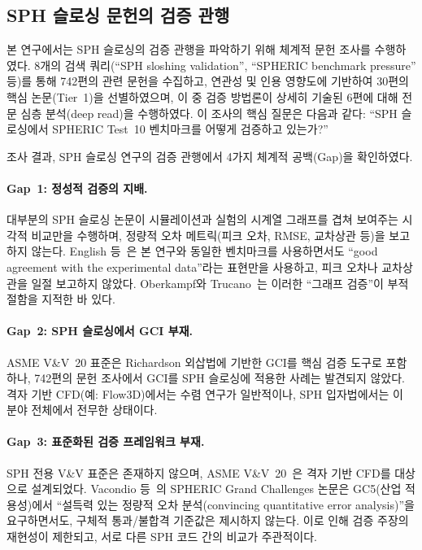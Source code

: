 \documentclass[11pt]{article}
\begin{document}
\subsection{SPH 슬로싱 문헌의 검증 관행} \label{sec:lit}

본 연구에서는 SPH 슬로싱의 검증 관행을 파악하기 위해 체계적 문헌 조사를 수행하였다.
8개의 검색 쿼리(``SPH sloshing validation'', ``SPHERIC benchmark pressure'' 등)를 통해
742편의 관련 문헌을 수집하고, 연관성 및 인용 영향도에 기반하여 30편의 핵심 논문(Tier~1)을
선별하였으며, 이 중 검증 방법론이 상세히 기술된 6편에 대해 전문 심층 분석(deep read)을
수행하였다.
이 조사의 핵심 질문은 다음과 같다:
``SPH 슬로싱에서 SPHERIC Test~10 벤치마크를 어떻게 검증하고 있는가?''

조사 결과, SPH 슬로싱 연구의 검증 관행에서 4가지 체계적 공백(Gap)을 확인하였다.

\paragraph{Gap~1: 정성적 검증의 지배.}
대부분의 SPH 슬로싱 논문이 시뮬레이션과 실험의 시계열 그래프를 겹쳐 보여주는
시각적 비교만을 수행하며, 정량적 오차 메트릭(피크 오차, RMSE, 교차상관 등)을
보고하지 않는다. English 등~\cite{English2022}은 본 연구와 동일한 벤치마크를
사용하면서도 ``good agreement with the experimental data''라는 표현만을 사용하고,
피크 오차나 교차상관을 일절 보고하지 않았다.
Oberkampf와 Trucano~\cite{Oberkampf2002}는 이러한 ``그래프 검증''이
부적절함을 지적한 바 있다.

\paragraph{Gap~2: SPH 슬로싱에서 GCI 부재.}
ASME V\&V~20 표준은 Richardson 외삽법에 기반한 GCI를 핵심 검증 도구로 포함하나,
742편의 문헌 조사에서 GCI를 SPH 슬로싱에 적용한 사례는 발견되지 않았다.
격자 기반 CFD(예: Flow3D)에서는 수렴 연구가 일반적이나, SPH 입자법에서는
이 분야 전체에서 전무한 상태이다.

\paragraph{Gap~3: 표준화된 검증 프레임워크 부재.}
SPH 전용 V\&V 표준은 존재하지 않으며, ASME V\&V~20~\cite{ASME2009}은
격자 기반 CFD를 대상으로 설계되었다.
Vacondio 등~\cite{Vacondio2020}의 SPHERIC Grand Challenges 논문은
GC5(산업 적용성)에서 ``설득력 있는 정량적 오차 분석(convincing quantitative error
analysis)''을 요구하면서도, 구체적 통과/불합격 기준값은 제시하지 않는다.
이로 인해 검증 주장의 재현성이 제한되고, 서로 다른 SPH 코드 간의 비교가 주관적이다.
\end{document}
